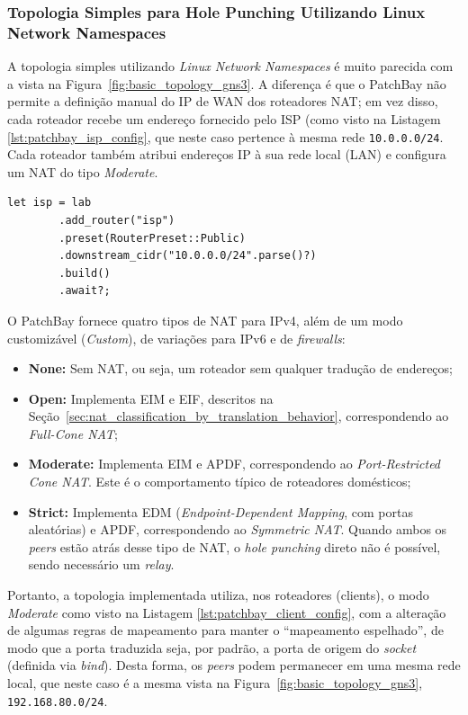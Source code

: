 \subsubsection{Topologia Simples para Hole Punching Utilizando Linux Network Namespaces}
\label{sec:basic_topology_network_namespaces}

A topologia simples utilizando \textit{Linux Network Namespaces} é muito parecida com a vista na Figura~\ref{fig:basic_topology_gns3}. A diferença é que o PatchBay não permite a definição manual do IP de WAN dos roteadores NAT; em vez disso, cada roteador recebe um endereço fornecido pelo ISP (como visto na Listagem \ref{lst:patchbay_isp_config}, que neste caso pertence à mesma rede \texttt{10.0.0.0/24}. Cada roteador também atribui endereços IP à sua rede local (LAN) e configura um NAT do tipo \textit{Moderate}.

\begin{lstlisting}[caption={Configuração do ISP no PatchBay.}, label={lst:patchbay_isp_config}]
    let isp = lab
        .add_router("isp")
        .preset(RouterPreset::Public)
        .downstream_cidr("10.0.0.0/24".parse()?)
        .build()
        .await?;
\end{lstlisting}

O PatchBay \citep{patchbay} fornece quatro tipos de NAT para IPv4, além de um modo customizável (\textit{Custom}), de variações para IPv6 e de \textit{firewalls}:

\begin{itemize}
    \item \textbf{None:} Sem NAT, ou seja, um roteador sem qualquer tradução de endereços;
    \item \textbf{Open:} Implementa EIM e EIF, descritos na Seção~\ref{sec:nat_classification_by_translation_behavior}, correspondendo ao \textit{Full-Cone NAT};
    \item \textbf{Moderate:} Implementa EIM e APDF, correspondendo ao \textit{Port-Restricted Cone NAT}. Este é o comportamento típico de roteadores domésticos;
    \item \textbf{Strict:} Implementa EDM (\textit{Endpoint-Dependent Mapping}, com portas aleatórias) e APDF, correspondendo ao \textit{Symmetric NAT}. Quando ambos os \textit{peers} estão atrás desse tipo de NAT, o \textit{hole punching} direto não é possível, sendo necessário um \textit{relay}.
\end{itemize}

Portanto, a topologia implementada utiliza, nos roteadores (clients), o modo \textit{Moderate} como visto na Listagem \ref{lst:patchbay_client_config}, com a alteração de algumas regras de mapeamento para manter o ``mapeamento espelhado'', de modo que a porta traduzida seja, por padrão, a porta de origem do \textit{socket} (definida via \textit{bind}). Desta forma, os \textit{peers} podem permanecer em uma mesma rede local, que neste caso é a mesma vista na Figura~\ref{fig:basic_topology_gns3}, \texttt{192.168.80.0/24}.

